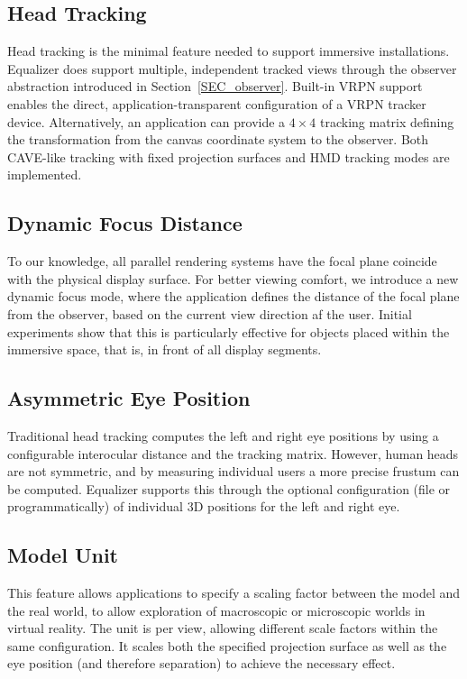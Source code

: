 \documentclass[10pt,journal,compsoc]{IEEEtran}
\newcommand{\sref}[1]{Section~\ref{#1}}
\begin{document}
\subsection{Head Tracking}

Head tracking is the minimal feature needed to support immersive
installations. Equalizer does support multiple, independent tracked views
through the observer abstraction introduced in \sref{SEC_observer}. Built-in
VRPN support enables the direct, application-transparent configuration of a VRPN
tracker device. Alternatively, an application can provide a $4\times 4$ tracking
matrix defining the transformation from the canvas coordinate system to the
observer. Both CAVE-like tracking with fixed projection surfaces and HMD
tracking modes are implemented.

\subsection{Dynamic Focus Distance}

To our knowledge, all parallel rendering systems have the focal plane coincide
with the physical display surface. For better viewing comfort, we introduce a
new dynamic focus mode, where the application defines the distance of the focal
plane from the observer, based on the current view direction af the
user. Initial experiments show that this is particularly effective for objects
placed within the immersive space, that is, in front of all display segments.

\subsection{Asymmetric Eye Position}

Traditional head tracking computes the left and right eye positions by using a
configurable interocular distance and the tracking matrix. However, human heads
are not symmetric, and by measuring individual users a more precise frustum can
be computed. Equalizer supports this through the optional configuration (file or
programmatically) of individual 3D positions for the left and right eye.

\subsection{Model Unit}

This feature allows applications to specify a scaling factor between the model
and the real world, to allow exploration of macroscopic or microscopic worlds in
virtual reality. The unit is per view, allowing different scale factors within
the same configuration. It scales both the specified projection surface as well
as the eye position (and therefore separation) to achieve the necessary effect.
\end{document}
